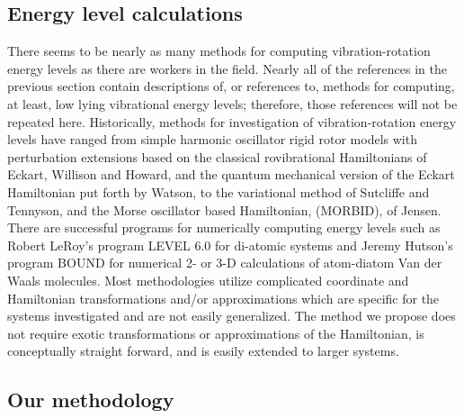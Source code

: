 \subsection{Energy level calculations}

There seems to be nearly as many methods for computing vibration-rotation
energy levels as there are workers in the field. Nearly all of the
references in the previous section contain descriptions of, or references
to, methods for computing, at least, low lying vibrational energy levels;
therefore, those references will not be repeated here. Historically, methods
for investigation of vibration-rotation energy levels have ranged from
simple harmonic oscillator rigid rotor models with perturbation extensions
based on the classical rovibrational Hamiltonians of Eckart\cite{Eckart35},
Willison and Howard\cite{WilsonHoward36}, and the quantum mechanical version
of the Eckart Hamiltonian put forth by Watson\cite{Watson68}, to the
variational method of Sutcliffe and Tennyson\cite{SutcliffeTennyson87}, and
the Morse oscillator based Hamiltonian, (MORBID), of Jensen\cite{Jensen88}.
There are successful programs for numerically computing energy levels such
as Robert LeRoy's program LEVEL 6.0\cite{LeRoy95} for di-atomic systems and
Jeremy Hutson's program BOUND\cite{Hutson93} for numerical 2- or 3-D
calculations of atom-diatom Van der Waals molecules. Most methodologies
utilize complicated coordinate and Hamiltonian transformations and/or
approximations which are specific for the systems investigated and are not
easily generalized. The method we propose does not require exotic
transformations or approximations of the Hamiltonian, is conceptually
straight forward, and is easily extended to larger systems.

\subsection{Our methodology}

